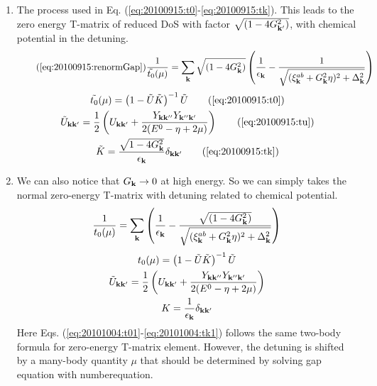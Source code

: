\begin{enumerate}
\item The process used in Eq. (\ref{eq:20100915:t0}-\ref{eq:20100915:tk}).  This leads to the zero energy T-matrix of reduced DoS with factor $\sqrt{(1-4G_{\mathbf{k}'}^{2})}$, with chemical potential in the detuning.  
\begin{equation}\tag{\ref{eq:20100915:renormGap}}
\nth{\tilde{t_{0}}(\mu)}=\sum_{\vk}\sqrt{(1-4G_{\vk}^{2})}
\br{\nth{\epsilon_{\vk}}-\nth{\sqrt{{(\xi^{ab}_{\vk}+  G_{\vk}^2\eta)^{2}+\Delta_{\vk}^{2}}}}}
\end{equation}
\begin{gather}
\tilde{t_{0}}(\mu)=\br{1-\tilde{U}\tilde{ K}}^{-1}\tilde{U}\tag{\ref{eq:20100915:t0}}\\
\tilde{U}_{\vk\vk'}=\nth{2} \br{U_{\vk\vk'}+\frac{Y_{\vk\vk''}Y_{\vk''\vk'}}{2(E^{0}-\eta+2\mu)}}\tag{\ref{eq:20100915:tu}}\\
\tilde{K}=\frac{\sqrt{1-4G_{\vk}^{2}}}{\epsilon_{\vk}}\delta_{\vk\vk'}\tag{\ref{eq:20100915:tk}}
\end{gather}
\item We can also notice that $G_{\mathbf{k}}\rightarrow0$ at high energy.  So we can simply takes the normal zero-energy T-matrix with detuning related to chemical potential.  
\begin{equation}\label{eq:20101004:renormGap1}
\frac{1}{{t_{0}}(\mu)}=\sum_{\mathbf{k}}
\left(\frac{1}{\epsilon_{\mathbf{k}}}-\frac{\sqrt{(1-4G_{\mathbf{k}}^{2})}}{\sqrt{{(\xi^{ab}_{\mathbf{k}}+  G_{\mathbf{k}}^2\eta)^{2}+\Delta_{\mathbf{k}}^{2}}}}\right)
\end{equation} 
\begin{gather}
{t_{0}}(\mu)=\left(1-\tilde{U}\tilde{ K}\right)^{-1}\tilde{U}\label{eq:20101004:t01}\\
\tilde{U}_{\mathbf{k}\mathbf{k}'}=\frac{1}{2} \left(U_{\mathbf{k}\mathbf{k}'}+\frac{Y_{\mathbf{k}\mathbf{k}''}Y_{\mathbf{k}''\mathbf{k}'}}{2(E^{0}-\eta+2\mu)}\right)\label{eq:20101004:tu1}\\
{K}=\frac{1}{\epsilon_{\mathbf{k}}}\delta_{\mathbf{k}\mathbf{k}'}\label{eq:20101004:tk1}
\end{gather}
Here Eqs. (\ref{eq:20101004:t01}-\ref{eq:20101004:tk1}) follows the same two-body formula for zero-energy T-matrix element.  However, the detuning is shifted by a many-body quantity $\mu$ that should be determined by solving gap equation with numberequation.    


\end{enumerate}
